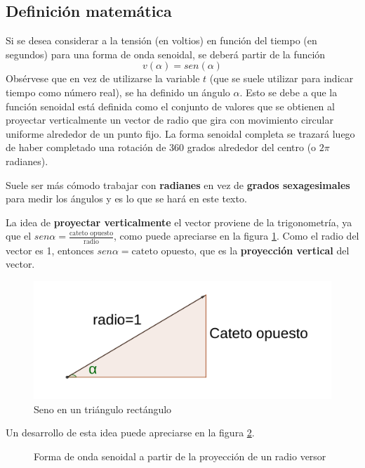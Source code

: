 \subsection{Definición matemática}
Si se desea considerar a la tensión (en voltios) en función del tiempo (en segundos) para una forma de onda senoidal, se deberá partir de la función $$v(\alpha) = sen (\alpha) $$
Obsérvese que en vez de utilizarse la variable $t$ (que se suele utilizar para indicar tiempo como número real), se ha definido un ángulo $\alpha$. Esto se debe a que la función senoidal está definida como el conjunto de valores que se obtienen al proyectar verticalmente un vector de radio que gira con movimiento circular uniforme alrededor de un punto fijo. La forma senoidal completa se trazará luego de haber completado una rotación de 360 grados alrededor del centro (o $2\pi$ radianes).

Suele ser más cómodo trabajar con \textbf{radianes} en vez de \textbf{grados sexagesimales} para medir los ángulos y es lo que se hará en este texto.

La idea de \textbf{proyectar verticalmente} el vector proviene de la trigonometría, ya que el $sen \alpha = \frac{\text{cateto opuesto}}{\text{radio}}$, como puede apreciarse en la figura \ref{fig:seno_triangulo}. Como el radio del vector es 1, entonces $ sen \alpha = \text{cateto opuesto} $, que es la \textbf{proyección vertical} del vector.

\begin{figure}[htbp]
  \includegraphics[scale=0.1]{images/seno_triangulo}
  \caption{Seno en un triángulo rectángulo}
  \label{fig:seno_triangulo}
\end{figure}

Un desarrollo de esta idea puede apreciarse en la figura \ref{fig:seno_proyectado}.
\begin{figure}[htbp]
  \caption{Forma de onda senoidal a partir de la proyección de un radio versor}
  \label{fig:seno_proyectado}
\end{figure}

